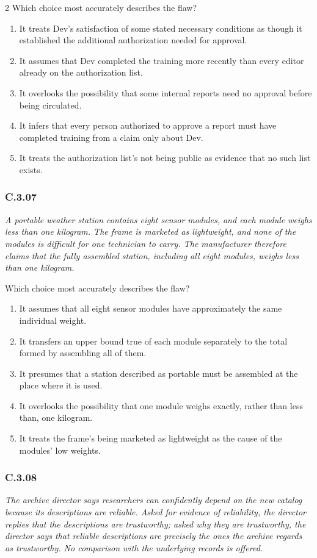 \documentclass[10pt]{extarticle}
\newcommand{\choice}[1]{\item #1}
\newcommand{\bankitem}[1]{\subsubsection*{#1}}
\begin{document}
\begin{multicols}{2}
Which choice most accurately describes the flaw?
\begin{enumerate}[label=(\alph*)]
  \choice{It treats Dev's satisfaction of some stated necessary conditions as though it established the additional authorization needed for approval.}
  \choice{It assumes that Dev completed the training more recently than every editor already on the authorization list.}
  \choice{It overlooks the possibility that some internal reports need no approval before being circulated.}
  \choice{It infers that every person authorized to approve a report must have completed training from a claim only about Dev.}
  \choice{It treats the authorization list's not being public as evidence that no such list exists.}
\end{enumerate}
\bankitem{C.3.07}
\emph{A portable weather station contains eight sensor modules, and each module weighs less than one kilogram. The frame is marketed as lightweight, and none of the modules is difficult for one technician to carry. The manufacturer therefore claims that the fully assembled station, including all eight modules, weighs less than one kilogram.}

Which choice most accurately describes the flaw?
\begin{enumerate}[label=(\alph*)]
  \choice{It assumes that all eight sensor modules have approximately the same individual weight.}
  \choice{It transfers an upper bound true of each module separately to the total formed by assembling all of them.}
  \choice{It presumes that a station described as portable must be assembled at the place where it is used.}
  \choice{It overlooks the possibility that one module weighs exactly, rather than less than, one kilogram.}
  \choice{It treats the frame's being marketed as lightweight as the cause of the modules' low weights.}
\end{enumerate}
\bankitem{C.3.08}
\emph{The archive director says researchers can confidently depend on the new catalog because its descriptions are reliable. Asked for evidence of reliability, the director replies that the descriptions are trustworthy; asked why they are trustworthy, the director says that reliable descriptions are precisely the ones the archive regards as trustworthy. No comparison with the underlying records is offered.}


\end{multicols}
\end{document}

